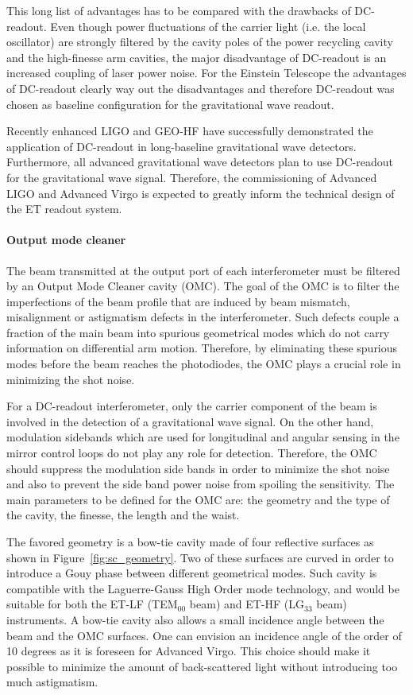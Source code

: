 %
This long list of advantages has to be compared with the drawbacks of DC-readout.
Even though power fluctuations of the carrier light (i.e. the local oscillator) 
are strongly filtered by the cavity poles of the power recycling cavity and the 
high-finesse arm cavities, the major disadvantage of DC-readout is  an
increased coupling of laser power noise. For the Einstein Telescope the advantages
of DC-readout clearly way out the disadvantages and therefore DC-readout was chosen as 
baseline configuration for the gravitational wave readout.


Recently enhanced LIGO and GEO-HF have successfully demonstrated the application
of DC-readout in long-baseline gravitational wave detectors. Furthermore, all advanced 
gravitational wave detectors plan to use DC-readout for the gravitational wave 
signal. Therefore, the commissioning of Advanced LIGO and Advanced Virgo is expected to greatly inform 
the technical design of the ET readout system. 

\FloatBarrier

\paragraph{Output mode cleaner}

The beam transmitted at the output port of each interferometer must be filtered by an Output Mode Cleaner cavity (OMC). 
The goal of the OMC is to filter the imperfections of the beam profile that are induced by beam mismatch, misalignment
 or astigmatism defects in the interferometer. Such defects couple a fraction of the main beam into spurious geometrical
  modes which do not carry information on differential arm motion. Therefore, by eliminating these spurious modes before 
  the beam reaches the photodiodes, the OMC plays a crucial role in minimizing the shot noise.

For a DC-readout interferometer, only the carrier component of the beam is involved in the detection of a gravitational wave
 signal. On the other hand, modulation sidebands which are used for longitudinal and angular sensing in the mirror control 
 loops do not play any role for detection. Therefore, the OMC should suppress the modulation side bands in order to minimize 
 the shot noise and also to prevent the side band power noise from spoiling the sensitivity.
The main parameters to be defined for the OMC are: the geometry and the type of the cavity, the finesse, the length and
 the waist.

The favored geometry is a bow-tie cavity made of four reflective surfaces as shown in Figure~\ref{fig:sc_geometry}. 
Two of these surfaces are curved in order to introduce a Gouy phase between different geometrical modes. Such cavity is 
compatible with the Laguerre-Gauss High Order mode technology, and would be suitable for both the ET-LF (TEM$_{00}$ beam) 
and ET-HF (LG$_{33}$ beam) instruments. A bow-tie cavity also allows a small incidence angle between the beam and the OMC 
surfaces. One can envision an incidence angle of the order of 10 degrees as it is foreseen for Advanced Virgo. This choice should 
make it possible to minimize the amount of back-scattered light without introducing too much astigmatism.

